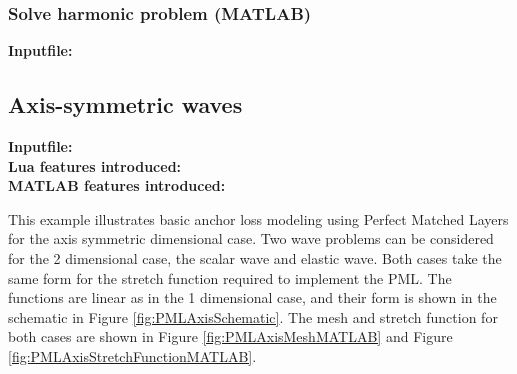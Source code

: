 \clearpage
\subsubsection*{Solve harmonic problem (MATLAB)}
\begin{flushleft}
  \textbf{Inputfile:}
  \\
\end{flushleft}
\hspace{1in}
{\footnotesize
{}
}


\clearpage
\subsection{Axis-symmetric waves}
\begin{flushleft}
  \textbf{Inputfile:}
  \\
  \textbf{Lua features introduced:}\\
  \textbf{MATLAB features introduced:}
\end{flushleft}
This example illustrates basic anchor loss
modeling using Perfect Matched Layers for the 
axis symmetric dimensional case. Two wave problems can
be considered for the 2 dimensional case, the
scalar wave and elastic wave. Both cases take
the same form for the stretch function required
to implement the PML. The functions are linear 
as in the 1 dimensional case, and their form
is shown in the schematic in Figure
\ref{fig:PMLAxisSchematic}. The mesh and stretch
function for both cases are shown in 
Figure \ref{fig:PMLAxisMeshMATLAB} and 
Figure \ref{fig:PMLAxisStretchFunctionMATLAB}.

